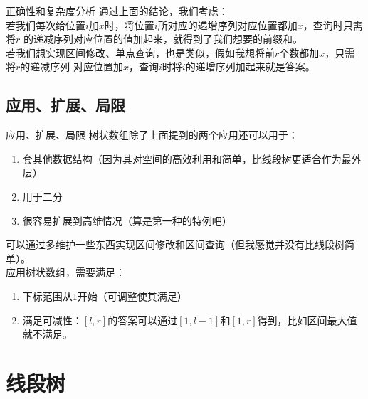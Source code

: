 \documentclass{beamer}
\begin{document}
			\begin{frame}{正确性和复杂度分析}
				通过上面的结论，我们考虑：\\
				若我们每次给位置$i$加$x$时，将位置$i$所对应的递增序列对应位置都加$x$，查询时只需将$r$
				的递减序列对应位置的值加起来，就得到了我们想要的前缀和。\\
				若我们想实现区间修改、单点查询，也是类似，假如我想将前$r$个数都加$x$，只需将$r$的递减序列
				对应位置加$x$，查询$i$时将$i$的递增序列加起来就是答案。
			\end{frame}
		\subsection{应用、扩展、局限}
			\begin{frame}{应用、扩展、局限}
				树状数组除了上面提到的两个应用还可以用于：
				\begin{enumerate}
					\item 套其他数据结构（因为其对空间的高效利用和简单，比线段树更适合作为最外层）
					\item 用于二分
					\item 很容易扩展到高维情况（算是第一种的特例吧）
				\end{enumerate}
				可以通过多维护一些东西实现区间修改和区间查询（但我感觉并没有比线段树简单）。\\
				应用树状数组，需要满足：
				\begin{enumerate}
					\item 下标范围从$1$开始（可调整使其满足）
					\item 满足可减性：$[l,r]$的答案可以通过$[1,l-1]$和$[1,r]$得到，比如区间最大值就不满足。
				\end{enumerate}
			\end{frame} 
	\section{线段树}
\end{document}

